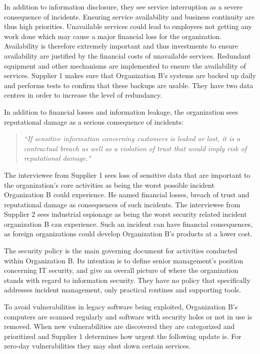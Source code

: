 In addition to information disclosure, they see service interruption as a severe consequence of incidents. Ensuring service availability and business continuity are thus high priorities. Unavailable services could lead to employees not getting any work done which may cause a major financial loss for the organization. Availability is therefore extremely important and thus investments to ensure availability are justified by the financial costs of unavailable services. Redundant equipment and other mechanisms are implemented to ensure the availability of services. Supplier 1 makes sure that Organization B's systems are backed up daily and performs tests to confirm that these backups are usable. They have two data centres in order to increase the level of redundancy.

In addition to financial losses and information leakage, the organization sees reputational damage as a serious consequence of incidents: 

\begin{quote}
\textit{``If sensitive information concerning customers is leaked or lost, it is a contractual breach as well as a violation of trust that would imply risk of reputational damage."}
\end{quote}

The interviewee from Supplier 1 sees loss of sensitive data that are important to the organization's core activities as being the worst possible incident Organization B could experience. He named financial losses, breach of trust and reputational damage as consequences of such incidents. The interviewee from Supplier 2 sees industrial espionage as being the worst security related incident organization B can experience. Such an incident can have financial consequences, as foreign organizations could develop Organization B's products at a lower cost. 

The security policy is the main governing document for activities conducted within Organization B. Its intention is to define senior management's position concerning IT security, and give an overall picture of where the organization stands with regard to information security. They have no policy that specifically addresses incident management, only practical routines and supporting tools.

To avoid vulnerabilities in legacy software being exploited, Organization B's computers are scanned regularly and software with security holes or not in use is removed. When new vulnerabilities are discovered they are categorized and prioritized and Supplier 1 determines how urgent the following update is. For zero-day vulnerabilities they may shut down certain services.

